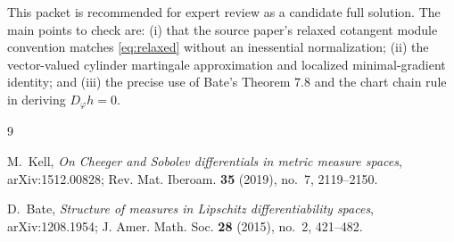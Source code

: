 \documentclass[11pt]{article}
\begin{document}
This packet is recommended for expert review as a candidate full solution.
The main points to check are: (i) that the source paper's relaxed cotangent
module convention matches \eqref{eq:relaxed} without an inessential
normalization; (ii) the vector-valued cylinder martingale approximation and
localized minimal-gradient identity; and (iii) the precise use of Bate's
Theorem 7.8 and the chart chain rule in deriving $D_\varphi h=0$.

\begin{thebibliography}{9}

M.~Kell,
\emph{On Cheeger and Sobolev differentials in metric measure spaces},
arXiv:1512.00828; Rev. Mat. Iberoam. \textbf{35} (2019), no.~7,
2119--2150.

D.~Bate,
\emph{Structure of measures in Lipschitz differentiability spaces},
arXiv:1208.1954; J. Amer. Math. Soc. \textbf{28} (2015), no.~2,
421--482.

\end{thebibliography}
\end{document}
